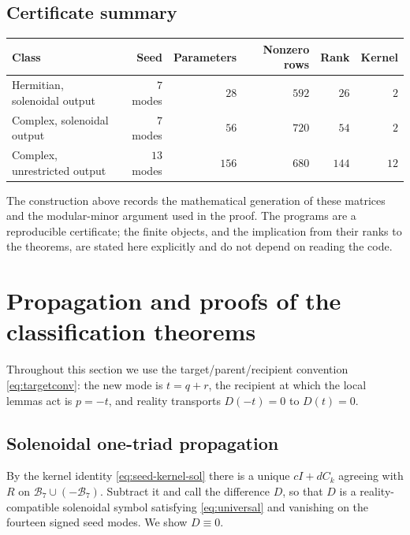 \documentclass[11pt]{article}
\theoremstyle{definition}
\theoremstyle{remark}
\theoremstyle{plain}
\newcommand{\Ck}{C_k}
\begin{document}
\subsection{Certificate summary}
\label{subsec:certsummary}

\begin{center}
\begin{tabular}{lrrrrr}
\hline
Class & Seed & Parameters & Nonzero rows & Rank & Kernel\\
\hline
Hermitian, solenoidal output & $7$ modes & $28$ & $592$ & $26$ & $2$\\
Complex, solenoidal output & $7$ modes & $56$ & $720$ & $54$ & $2$\\
Complex, unrestricted output & $13$ modes & $156$ & $680$ & $144$ & $12$\\
\hline
\end{tabular}
\end{center}

The construction above records the mathematical generation of these matrices
and the modular-minor argument used in the proof. The programs are a
reproducible certificate; the finite objects, and the implication from their
ranks to the theorems, are stated here explicitly and do not depend on reading
the code.

\section{Propagation and proofs of the classification theorems}
\label{sec:propagation}

Throughout this section we use the target/parent/recipient convention
\eqref{eq:targetconv}: the new mode is $t=q+r$, the recipient at which the
local lemmas act is $p=-t$, and reality transports $D(-t)=0$ to $D(t)=0$.

\subsection{Solenoidal one-triad propagation}
\label{subsec:solprop}

By the kernel identity \eqref{eq:seed-kernel-sol} there is a unique $cI+d\Ck$
agreeing with $R$ on $\mathcal B_{7}\cup(-\mathcal B_{7})$. Subtract it and
call the difference $D$, so that $D$ is a reality-compatible solenoidal symbol
satisfying \eqref{eq:universal} and vanishing on the fourteen signed seed
modes. We show $D\equiv0$.
\end{document}
